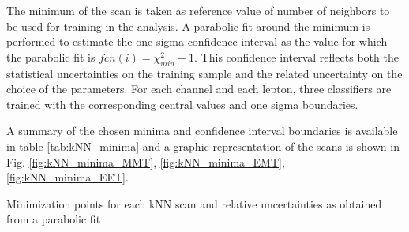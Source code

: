 The minimum of the scan is taken as reference value of number of neighbors to be used for training in the analysis. A parabolic fit around the minimum is performed to estimate the one sigma confidence interval as the value for which the parabolic fit is $fcn(i) = \chi^2_{min} + 1$. This confidence interval reflects both the statistical uncertainties on the training sample and the related uncertainty on the choice of the parameters. For each channel and each lepton, three classifiers are trained with the corresponding central values and one sigma boundaries.

A summary of the chosen minima and confidence interval boundaries is available in table \ref{tab:kNN_minima} and a graphic representation of the scans is shown in Fig. \ref{fig:kNN_minima_MMT}, \ref{fig:kNN_minima_EMT}, \ref{fig:kNN_minima_EET}.


\begin{table}


\caption{Minimization points for each kNN scan and relative uncertainties as obtained from a parabolic fit}
\label{tab:kNN_minima}
\end{table}

